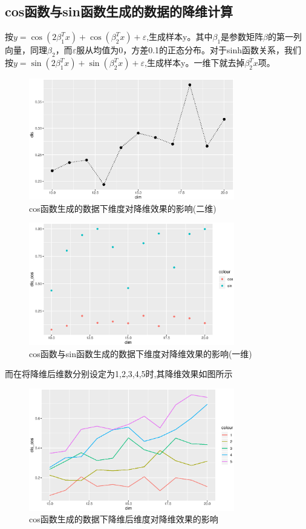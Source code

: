 \subsection{cos函数与sin函数生成的数据的降维计算}
按$y=\cos(2\beta_1^Tx)+\cos(\beta_2^Tx)+\varepsilon$,生成样本y。其中$\beta_1$是参数矩阵$\beta$的第一列向量，同理$\beta_2$，而$\varepsilon$服从均值为0，方差0.1的正态分布。对于sinh函数关系，我们按$y=\sin(2\beta_1^Tx)+\sin(\beta_2^Tx)+\varepsilon$,生成样本y。一维下就去掉$\beta_2^Tx$项。
\begin{figure}[H]
    \centering
    \includegraphics[width=0.8\textwidth]{image/cos_save.eps}
    \caption{cos函数生成的数据下维度对降维效果的影响(二维)}
\end{figure}

\begin{figure}[H]
    \centering
    \includegraphics[width=0.8\textwidth]{image/compare_save_one.eps}
    \caption{cos函数与sin函数生成的数据下维度对降维效果的影响(一维)}
\end{figure}

而在将降维后维数分别设定为1,2,3,4,5时,其降维效果如图所示
\begin{figure}[H]
    \centering
    \includegraphics[width=0.8\textwidth]{image/compare_dim_save.eps}
    \caption{cos函数生成的数据下降维后维度对降维效果的影响}
\end{figure}

